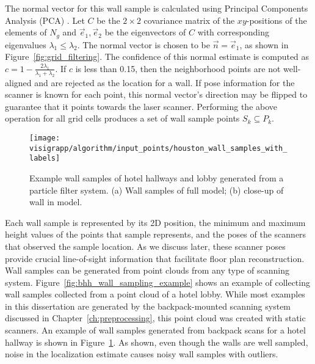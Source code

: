 \documentclass[12pt,onecolumn,oneside]{book}
\begin{document}
The normal vector for this wall sample is calculated using Principal Components Analysis (PCA) \cite{PCA}.  Let $C$ be the $2 \times 2$ covariance matrix of the $xy$-positions of the elements of $N_g$ and $\vec{e}_1, \vec{e}_2$ be the eigenvectors of $C$ with corresponding eigenvalues $\lambda_1 \leq \lambda_2$.  The normal vector is chosen to be $\vec{n} = \vec{e}_1$, as shown in Figure~\ref{fig:grid_filtering}.  The confidence of this normal estimate is computed as $c = 1 - \frac{2 \lambda_1}{\lambda_1 + \lambda_2}$.  If $c$ is less than 0.15, then the neighborhood points are not well-aligned and are rejected as the location for a wall.  If pose information for the scanner is known for each point, this normal vector's direction may be flipped to guarantee that it points towards the laser scanner.  Performing the above operation for all grid cells produces a set of wall sample points $S_k \subseteq P_k$. 


\begin{figure}[t]
  \centering
  \texttt{[image: visigrapp/algorithm/input\_points/houston\_wall\_samples\_with\_labels]}
  \caption[Wall samples from backpack point cloud.]{Example wall samples of hotel hallways and lobby generated from a particle filter system. (a) Wall samples of full model; (b) close-up of wall in model.}
  \label{fig:backpack_wall_sample_example}
\end{figure}

Each wall sample is represented by its 2D position, the minimum and maximum height values of the points that sample represents, and the poses of the scanners that observed the sample location.  As we discuss later, these scanner poses provide crucial line-of-sight information that facilitate floor plan reconstruction.  Wall samples can be generated from point clouds from any type of scanning system.  Figure~\ref{fig:bhh_wall_sampling_example} shows an example of collecting wall samples collected from a point cloud of a hotel lobby.  While most examples in this dissertation are generated by the backpack-mounted scanning system discussed in Chapter~\ref{ch:preprocessing}, this point cloud was created with static scanners. An example of wall samples generated from backpack scans for a hotel hallway is shown in Figure~\ref{fig:backpack_wall_sample_example}.  As shown, even though the walls are well sampled, noise in the localization estimate causes noisy wall samples with outliers.
\end{document}
